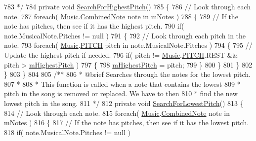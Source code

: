 \begin{DoxyCodeInclude}
783 \textcolor{comment}{    */}
784     \textcolor{keyword}{private} \textcolor{keywordtype}{void} \hyperlink{group___song_priv_func_ga5f837e6b7f576732fa38747caa057621}{SearchForHighestPitch}()
785     \{
786         \textcolor{comment}{// Look through each note.}
787         \textcolor{keywordflow}{foreach}( \hyperlink{class_music}{Music}.\hyperlink{group___music_structs_struct_music_1_1_combined_note}{CombinedNote} note in mNotes )
788         \{
789             \textcolor{comment}{// If the note has pitches, then see if it has the highest pitch.}
790             \textcolor{keywordflow}{if}( note.MusicalNote.Pitches != null )
791             \{
792                 \textcolor{comment}{// Look through each pitch in the note.}
793                 \textcolor{keywordflow}{foreach}( \hyperlink{class_music}{Music}.\hyperlink{group___music_enums_ga508f69b199ea518f935486c990edac1d}{PITCH} pitch in note.MusicalNote.Pitches )
794                 \{
795                     \textcolor{comment}{// Update the highest pitch if needed.}
796                     \textcolor{keywordflow}{if}( pitch != \hyperlink{class_music}{Music}.\hyperlink{group___music_enums_ga508f69b199ea518f935486c990edac1d}{PITCH}.REST && pitch > 
      \hyperlink{group___song_priv_var_ga2dcd39d9add609e9df56a94057441dcc}{mHighestPitch} )
797                     \{
798                         \hyperlink{group___song_priv_var_ga2dcd39d9add609e9df56a94057441dcc}{mHighestPitch} = pitch;
799                     \}
800                 \}
801             \}
802         \}
803     \}
804 \textcolor{comment}{}
805 \textcolor{comment}{    /**}
806 \textcolor{comment}{     * @brief Searches through the notes for the lowest pitch. }
807 \textcolor{comment}{     * }
808 \textcolor{comment}{     * This function is called when a note that contains the lowest}
809 \textcolor{comment}{     * pitch in the song is removed or replaced. We have to then}
810 \textcolor{comment}{     * find the new lowest pitch in the song.}
811 \textcolor{comment}{    */}
812     \textcolor{keyword}{private} \textcolor{keywordtype}{void} \hyperlink{group___song_priv_func_gac2e812c6385529eb7a9be5082c7bde75}{SearchForLowestPitch}()
813     \{
814         \textcolor{comment}{// Look through each note.}
815         \textcolor{keywordflow}{foreach}( \hyperlink{class_music}{Music}.\hyperlink{group___music_structs_struct_music_1_1_combined_note}{CombinedNote} note in mNotes )
816         \{
817             \textcolor{comment}{// If the note has pitches, then see if it has the lowest pitch.}
818             \textcolor{keywordflow}{if}( note.MusicalNote.Pitches != null )

\end{DoxyCodeInclude}
